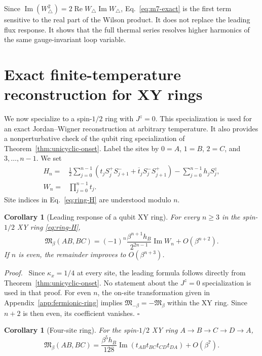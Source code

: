 \documentclass[aps,prb,preprint,nofootinbib,longbibliography]{revtex4-2}
\newcommand{\Mmod}{\mathfrak{M}}
\newtheorem{corollary}[theorem]{Corollary}
\newenvironment{proof}{\par\noindent\textit{Proof.}\ }%
{\unskip\nobreak\hfill\(\square\)\par}
\begin{document}
Since $\operatorname{Im}(W_\triangle^2)=2\operatorname{Re}W_\triangle
\operatorname{Im}W_\triangle$, Eq.~\eqref{eq:m7-exact} is the first term
sensitive to the real part of the Wilson product.  It does not replace the
leading flux response.  It shows that the full thermal series resolves higher
harmonics of the same gauge-invariant loop variable.

\section{Exact finite-temperature reconstruction for XY rings}
\label{sec:free-fermion-rings}

We now specialize to a spin-$1/2$ ring with $J^z=0$.  This specialization is
used for an exact Jordan--Wigner reconstruction at arbitrary temperature.  It
also provides a nonperturbative check of the qubit ring specialization of
Theorem~\ref{thm:unicyclic-onset}.  Label the sites by $0=A$, $1=B$, $2=C$,
and $3,\ldots,n-1$.  We set
\begin{align}
 H_n={}&\frac12\sum_{j=0}^{n-1}
 \left(t_jS_j^+S_{j+1}^-+\overline t_jS_j^-S_{j+1}^+\right)
 -\sum_{j=0}^{n-1}h_jS_j^z,
 \label{eq:ring-H}\\
 W_n={}&\prod_{j=0}^{n-1}t_j.
 \label{eq:Wn}
\end{align}
Site indices in Eq.~\eqref{eq:ring-H} are understood modulo $n$.

\begin{corollary}[Leading response of a qubit XY ring]
\label{thm:ring-law}
For every $n\ge3$ in the spin-$1/2$ XY ring \eqref{eq:ring-H},
\begin{equation}
 \boxed{
 \Mmod_\beta(AB,BC)
 =(-1)^n\frac{\beta^{n+1}h_B}{2^{2n-1}}
 \operatorname{Im}W_n+O(\beta^{n+2})}.
 \label{eq:ring-law}
\end{equation}
If $n$ is even, the remainder improves to $O(\beta^{n+3})$.
\end{corollary}

\begin{proof}
Since $\kappa_x=1/4$ at every site, the leading formula follows directly from
Theorem~\ref{thm:unicyclic-onset}.  No statement about the $J^z=0$
specialization is used in that proof.
For even $n$, the on-site transformation given in
Appendix~\ref{app:fermionic-ring} implies
$\Mmod_{-\beta}=-\Mmod_\beta$ within the XY ring.  Since
$n+2$ is then even, its coefficient vanishes.
\end{proof}

\begin{corollary}[Four-site ring]
\label{thm:square}
For the spin-$1/2$ XY ring $A\to B\to C\to D\to A$,
\begin{equation}
 \Mmod_\beta(AB,BC)
 =\frac{\beta^5h_B}{128}
 \operatorname{Im}(t_{AB}t_{BC}t_{CD}t_{DA})+O(\beta^7).
 \label{eq:square-main}
\end{equation}
\end{corollary}
\end{document}
